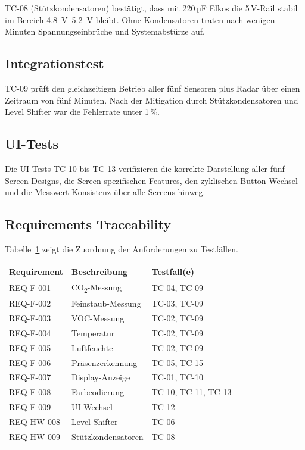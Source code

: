 TC-08 (Stützkondensatoren) bestätigt, dass mit 220\,µF Elkos die 5\,V-Rail stabil im Bereich \SI{4,8}{V}--\SI{5,2}{V} bleibt. Ohne Kondensatoren traten nach wenigen Minuten Spannungseinbrüche und Systemabstürze auf.

\subsection{Integrationstest}

TC-09 prüft den gleichzeitigen Betrieb aller fünf Sensoren plus Radar über einen Zeitraum von fünf Minuten. Nach der Mitigation durch Stützkondensatoren und Level Shifter war die Fehlerrate unter 1\,\%.

\subsection{UI-Tests}

Die UI-Tests TC-10 bis TC-13 verifizieren die korrekte Darstellung aller fünf Screen-Designs, die Screen-spezifischen Features, den zyklischen Button-Wechsel und die Messwert-Konsistenz über alle Screens hinweg.

\subsection{Requirements Traceability}

Tabelle~\ref{tab:traceability} zeigt die Zuordnung der Anforderungen zu Testfällen.

\begin{table}[htb]
\centering
\renewcommand{\arraystretch}{1.2}
\label{tab:traceability}
\begin{tabular}{l l l}
\toprule
\rowcolor{tableheader}
\textbf{Requirement} & \textbf{Beschreibung} & \textbf{Testfall(e)} \\
\midrule
REQ-F-001 & CO\textsubscript{2}-Messung & TC-04, TC-09 \\
REQ-F-002 & Feinstaub-Messung & TC-03, TC-09 \\
REQ-F-003 & VOC-Messung & TC-02, TC-09 \\
REQ-F-004 & Temperatur & TC-02, TC-09 \\
REQ-F-005 & Luftfeuchte & TC-02, TC-09 \\
REQ-F-006 & Präsenzerkennung & TC-05, TC-15 \\
REQ-F-007 & Display-Anzeige & TC-01, TC-10 \\
REQ-F-008 & Farbcodierung & TC-10, TC-11, TC-13 \\
REQ-F-009 & UI-Wechsel & TC-12 \\
REQ-HW-008 & Level Shifter & TC-06 \\
REQ-HW-009 & Stützkondensatoren & TC-08 \\
\bottomrule
\end{tabular}
\end{table}
